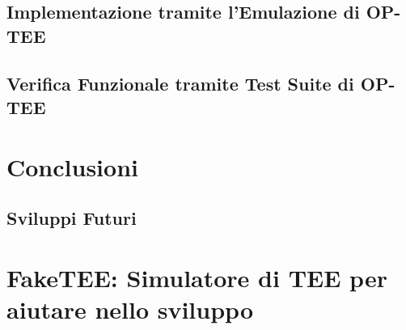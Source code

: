 \documentclass[12pt,italian]{report}
\begin{document}
\section{Implementazione tramite l'Emulazione di OP-TEE}
\label{sec:implementazione-passthrough-tramite-bootloader}

\section{Verifica Funzionale tramite Test Suite di OP-TEE}
\label{sec:verifica-funzionale-via-optee}

\chapter{Conclusioni}
\label{chap:conclusioni}


\section{Sviluppi Futuri}
\label{sec:sviluppi-futuri}

\appendix
\chapter{FakeTEE: Simulatore di TEE per aiutare nello sviluppo}



\end{document}

